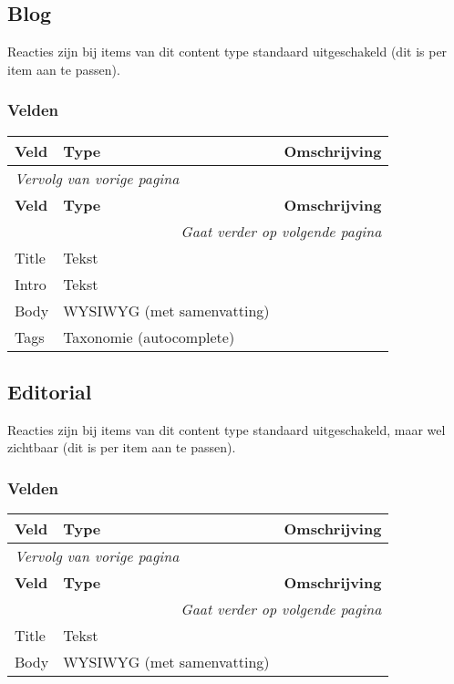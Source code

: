 \subsection{Blog}
\label{sec:content-blog}
Reacties zijn bij items van dit content type standaard uitgeschakeld (dit is per item aan te passen).

\subsubsection{Velden}
  \begin{longtable}{| p{3.75cm}|p{3.75cm}|p{7.50cm}|}
  \hline
  \rowcolor{tableheader}
  \textbf{Veld} & \textbf{Type} & \textbf{Omschrijving}  \tabularnewline
  \hline
\endfirsthead
\multicolumn{3}{l}{\textit{Vervolg van vorige pagina}} \\
\hline
\rowcolor{tableheader}
  \textbf{Veld} & \textbf{Type} & \textbf{Omschrijving}  \tabularnewline
  \hline
\hline
\endhead
\multicolumn{3}{r}{\textit{Gaat verder op volgende pagina}} \\
\endfoot
\hline
\endlastfoot
  \raggedright{Title} & \raggedright{Tekst} & \raggedright{}  \tabularnewline
  \hline
  \raggedright{Intro} & \raggedright{Tekst} & \raggedright{}  \tabularnewline
  \hline
  \raggedright{Body} & \raggedright{WYSIWYG (met samenvatting)} & \raggedright{}  \tabularnewline
  \hline
  \raggedright{Tags} & \raggedright{Taxonomie (autocomplete)} & \raggedright{}  \tabularnewline
  \hline
  \end{longtable}

\subsection{Editorial}
\label{sec:content-editorial}
Reacties zijn bij items van dit content type standaard uitgeschakeld, maar wel zichtbaar (dit is per item aan te passen).

\subsubsection{Velden}
  \begin{longtable}{| p{3.75cm}|p{3.75cm}|p{7.50cm}|}
  \hline
  \rowcolor{tableheader}
  \textbf{Veld} & \textbf{Type} & \textbf{Omschrijving}  \tabularnewline
  \hline
\endfirsthead
\multicolumn{3}{l}{\textit{Vervolg van vorige pagina}} \\
\hline
\rowcolor{tableheader}
  \textbf{Veld} & \textbf{Type} & \textbf{Omschrijving}  \tabularnewline
  \hline
\hline
\endhead
\multicolumn{3}{r}{\textit{Gaat verder op volgende pagina}} \\
\endfoot
\hline
\endlastfoot
  \raggedright{Title} & \raggedright{Tekst} & \raggedright{}  \tabularnewline
  \hline
  \raggedright{Body} & \raggedright{WYSIWYG (met samenvatting)} & \raggedright{}  \tabularnewline
  \hline
  \end{longtable}


